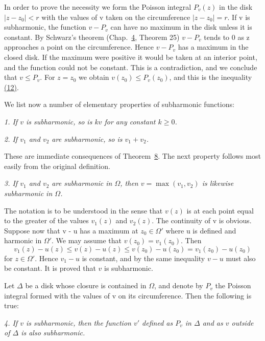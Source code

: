 In order to prove the necessity we form the Poisson integral $P_{v}(z)$ in the disk $|z - z_{0}| < r$ with the values of v taken on the circumference $|z - z_{0}| = r$. If v is subharmonic, the function $v - P_{v}$ can have no maximum in the disk unless it is constant. By Schwarz's theorem (Chap.~\hyperref[chap:4]{4}, Theorem 25) $v - P_{v}$ tends to 0 as z approaches a point on the circumference. Hence $v - P_{v}$ has a maximum in the closed disk. If the maximum were positive it would be taken at an interior point, and the function could not be constant. This is a contradiction, and we conclude that $v \leq P_{v}$. For $z = z_{0}$ we obtain $v(z_{0}) \leq P_{v}(z_{0})$, and this is the inequality \hyperref[eq:6.12]{(12)}.

We list now a number of elementary properties of subharmonic functions:

\textit{1. If $v$ is subharmonic, so is $kv$ for any constant $k \geq 0$.}

\textit{2. If $v_{1}$ and $v_{2}$ are subharmonic, so is $v_{1} + v_{2}$.}

These are immediate consequences of Theorem~\hyperref[thm:6.8]{8}. The next property follows most easily from the original definition.

\textit{3. If $v_{1}$ and $v_{2}$ are subharmonic in $\Omega$, then $v = \max (v_{1}, v_{2})$ is likewise subharmonic in $\Omega$.}


The notation is to be understood in the sense that $v(z)$ is at each point equal to the greater of the values $v_{1}(z)$ and $v_{2}(z)$. The continuity of v is obvious. Suppose now that v - u has a maximum at $z_{0} \in \Omega'$ where u is defined and harmonic in $\Omega'$. We may assume that $v(z_{0}) = v_{1}(z_{0})$. Then
\begin{equation*}
v _ {1} (z) - u (z) \leq v (z) - u (z) \leq v (z _ {0}) - u (z _ {0}) = v _ {1} (z _ {0}) - u (z _ {0})
\end{equation*}
for $z \in \Omega'$. Hence $v_1 - u$ is constant, and by the same inequality $v - u$ must also be constant. It is proved that $v$ is subharmonic.

Let $\Delta$ be a disk whose closure is contained in $\Omega$, and denote by $P_{v}$ the Poisson integral formed with the values of v on its circumference. Then the following is true:

\textit{4. If $v$ is subharmonic, then the function $v'$ defined as $P_v$ in $\Delta$ and as $v$ outside of $\Delta$ is also subharmonic.}

